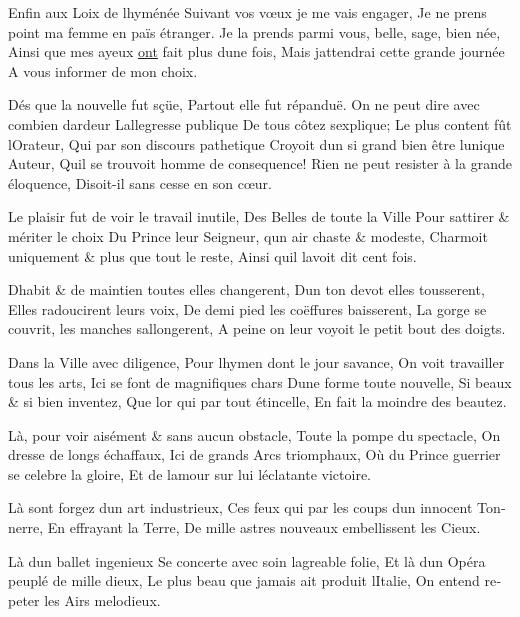 \documentclass[14pt,a4paper]{memoir}
\newcommand{\ul}[1]{\uline{#1}}
\begin{document}
\begin{otherlanguage}{french}
{Enfin aux Loix de l\textquotesingle hyménée} {Suivant vos vœux je me
vais engager,} {Je ne prens point ma femme en païs étranger.} {Je la
prends parmi vous, belle, sage, bien née, } {Ainsi que mes ayeux
\ul{ont} fait plus d\textquotesingle une fois,} {Mais
j\textquotesingle attendrai cette grande journée} {A vous informer de
mon choix.}

{Dés que la nouvelle fut sçüe,} {Partout elle fut répanduë.} {On ne peut
dire avec combien d\textquotesingle ardeur}
{L\textquotesingle allegresse publique} {De tous côtez
s\textquotesingle explique;} {Le plus content fût
l\textquotesingle Orateur,} {Qui par son discours pathetique} {Croyoit
d\textquotesingle un si grand bien être l\textquotesingle unique Auteur,
} {Qu\textquotesingle il se trouvoit homme de consequence!} {Rien ne
peut resister à la grande éloquence,} {Disoit-il sans cesse en son
cœur.}

{Le plaisir fut de voir le travail inutile,} {Des Belles de toute la
Ville} {Pour s\textquotesingle attirer \& mériter le choix} {Du Prince
leur Seigneur, q\textquotesingle un air chaste \& modeste,} {Charmoit
uniquement \& plus que tout le reste, } {Ainsi qu\textquotesingle il
l\textquotesingle avoit dit cent fois.}

{D\textquotesingle habit \& de maintien toutes elles changerent,}
{D\textquotesingle un ton devot elles tousserent,} {Elles radoucirent
leurs voix,} {De demi pied les coëffures baisserent,} {La gorge se
couvrit, les manches s\textquotesingle allongerent, } {A peine on leur
voyoit le petit bout des doigts. }

{Dans la Ville avec diligence,} {Pour l\textquotesingle hymen dont le
jour s\textquotesingle avance,} {On voit travailler tous les arts,} {Ici
se font de magnifiques chars} {D\textquotesingle une forme toute
nouvelle,} {Si beaux \& si bien inventez,} {Que l\textquotesingle or qui
par tout étincelle,} {En fait la moindre des beautez.}

{Là, pour voir aisément \& sans aucun obstacle, } {Toute la pompe du
spectacle,} {On dresse de longs échaffaux,} {Ici de grands Arcs
triomphaux,} {Où du Prince guerrier se celebre la gloire,} {Et de
l\textquotesingle amour sur lui l\textquotesingle éclatante victoire.}

{Là sont forgez d\textquotesingle un art industrieux,} {Ces feux qui par
les coups d\textquotesingle un innocent Tonnerre,} {En effrayant la
Terre,} {De mille astres nouveaux embellissent les Cieux. }

{Là d\textquotesingle un ballet ingenieux} {Se concerte avec soin
l\textquotesingle agreable folie,} {Et là d\textquotesingle un Opéra
peuplé de mille dieux,} {Le plus beau que jamais ait produit
l\textquotesingle Italie,} {On entend repeter les Airs melodieux.}


\end{otherlanguage}
\end{document}
